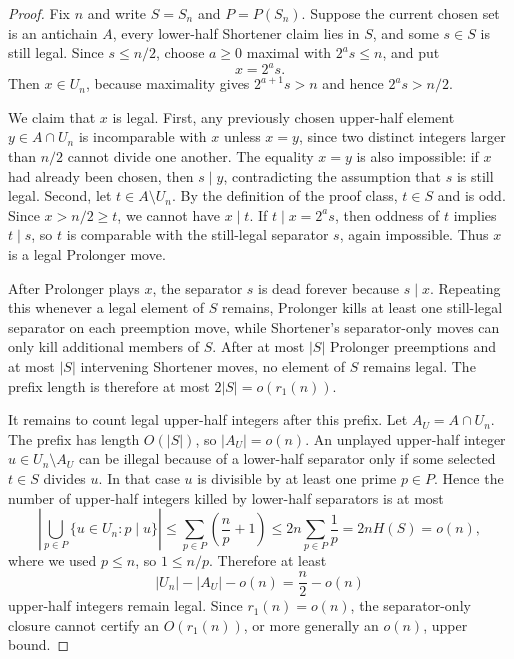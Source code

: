 \begin{proof}
Fix $n$ and write $S=S_n$ and $P=P(S_n)$.  Suppose the current chosen set is an
antichain $A$, every lower-half Shortener claim lies in $S$, and some
$s\in S$ is still legal.  Since $s\le n/2$, choose $a\ge 0$ maximal with
$2^as\le n$, and put
\[
  x=2^as.
\]
Then $x\in U_n$, because maximality gives $2^{a+1}s>n$ and hence
$2^as>n/2$.

We claim that $x$ is legal.  First, any previously chosen upper-half element
$y\in A\cap U_n$ is incomparable with $x$ unless $x=y$, since two distinct
integers larger than $n/2$ cannot divide one another.  The equality $x=y$ is
also impossible: if $x$ had already been chosen, then $s\mid y$, contradicting
the assumption that $s$ is still legal.  Second, let $t\in A\setminus U_n$.
By the definition of the proof class, $t\in S$ and is odd.  Since
$x>n/2\ge t$, we cannot have $x\mid t$.  If $t\mid x=2^as$, then oddness of
$t$ implies $t\mid s$, so $t$ is comparable with the still-legal separator
$s$, again impossible.  Thus $x$ is a legal Prolonger move.

After Prolonger plays $x$, the separator $s$ is dead forever because
$s\mid x$.  Repeating this whenever a legal element of $S$ remains, Prolonger
kills at least one still-legal separator on each preemption move, while
Shortener's separator-only moves can only kill additional members of $S$.
After at most $|S|$ Prolonger preemptions and at most $|S|$ intervening
Shortener moves, no element of $S$ remains legal.  The prefix length is
therefore at most $2|S|=o(r_1(n))$.

It remains to count legal upper-half integers after this prefix.  Let
$A_U=A\cap U_n$.  The prefix has length $O(|S|)$, so $|A_U|=o(n)$.  An
unplayed upper-half integer $u\in U_n\setminus A_U$ can be illegal because of
a lower-half separator only if some selected $t\in S$ divides $u$.  In that
case $u$ is divisible by at least one prime $p\in P$.  Hence the number of
upper-half integers killed by lower-half separators is at most
\[
  \left|\bigcup_{p\in P}\{u\in U_n:p\mid u\}\right|
  \le
  \sum_{p\in P}\left(\frac np+1\right)
  \le
  2n\sum_{p\in P}\frac1p
  =2nH(S)=o(n),
\]
where we used $p\le n$, so $1\le n/p$.  Therefore at least
\[
  |U_n|-|A_U|-o(n)=\frac n2-o(n)
\]
upper-half integers remain legal.  Since $r_1(n)=o(n)$, the separator-only
closure cannot certify an $O(r_1(n))$, or more generally an $o(n)$, upper
bound.
\end{proof}

